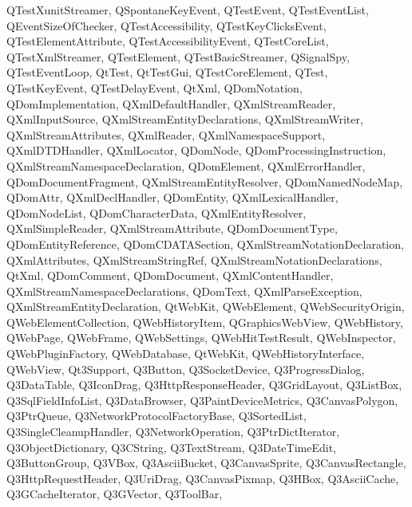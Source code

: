 {{    QTestXunitStreamer,%
    QSpontaneKeyEvent,%
    QTestEvent,%
    QTestEventList,%
    QEventSizeOfChecker,%
    QTestAccessibility,%
    QTestKeyClicksEvent,%
    QTestElementAttribute,%
    QTestAccessibilityEvent,%
    QTestCoreList,%
    QTestXmlStreamer,%
    QTestElement,%
    QTestBasicStreamer,%
    QSignalSpy,%
    QTestEventLoop,%
    QtTest,%
    QtTestGui,%
    QTestCoreElement,%
    QTest,%
    QTestKeyEvent,%
    QTestDelayEvent,%
    QtXml,%
    QDomNotation,%
    QDomImplementation,%
    QXmlDefaultHandler,%
    QXmlStreamReader,%
    QXmlInputSource,%
    QXmlStreamEntityDeclarations,%
    QXmlStreamWriter,%
    QXmlStreamAttributes,%
    QXmlReader,%
    QXmlNamespaceSupport,%
    QXmlDTDHandler,%
    QXmlLocator,%
    QDomNode,%
    QDomProcessingInstruction,%
    QXmlStreamNamespaceDeclaration,%
    QDomElement,%
    QXmlErrorHandler,%
    QDomDocumentFragment,%
    QXmlStreamEntityResolver,%
    QDomNamedNodeMap,%
    QDomAttr,%
    QXmlDeclHandler,%
    QDomEntity,%
    QXmlLexicalHandler,%
    QDomNodeList,%
    QDomCharacterData,%
    QXmlEntityResolver,%
    QXmlSimpleReader,%
    QXmlStreamAttribute,%
    QDomDocumentType,%
    QDomEntityReference,%
    QDomCDATASection,%
    QXmlStreamNotationDeclaration,%
    QXmlAttributes,%
    QXmlStreamStringRef,%
    QXmlStreamNotationDeclarations,%
    QtXml,%
    QDomComment,%
    QDomDocument,%
    QXmlContentHandler,%
    QXmlStreamNamespaceDeclarations,%
    QDomText,%
    QXmlParseException,%
    QXmlStreamEntityDeclaration,%
    QtWebKit,%
    QWebElement,%
    QWebSecurityOrigin,%
    QWebElementCollection,%
    QWebHistoryItem,%
    QGraphicsWebView,%
    QWebHistory,%
    QWebPage,%
    QWebFrame,%
    QWebSettings,%
    QWebHitTestResult,%
    QWebInspector,%
    QWebPluginFactory,%
    QWebDatabase,%
    QtWebKit,%
    QWebHistoryInterface,%
    QWebView,%
    Qt3Support,%
    Q3Button,%
    Q3SocketDevice,%
    Q3ProgressDialog,%
    Q3DataTable,%
    Q3IconDrag,%
    Q3HttpResponseHeader,%
    Q3GridLayout,%
    Q3ListBox,%
    Q3SqlFieldInfoList,%
    Q3DataBrowser,%
    Q3PaintDeviceMetrics,%
    Q3CanvasPolygon,%
    Q3PtrQueue,%
    Q3NetworkProtocolFactoryBase,%
    Q3SortedList,%
    Q3SingleCleanupHandler,%
    Q3NetworkOperation,%
    Q3PtrDictIterator,%
    Q3ObjectDictionary,%
    Q3CString,%
    Q3TextStream,%
    Q3DateTimeEdit,%
    Q3ButtonGroup,%
    Q3VBox,%
    Q3AsciiBucket,%
    Q3CanvasSprite,%
    Q3CanvasRectangle,%
    Q3HttpRequestHeader,%
    Q3UriDrag,%
    Q3CanvasPixmap,%
    Q3HBox,%
    Q3AsciiCache,%
    Q3GCacheIterator,%
    Q3GVector,%
    Q3ToolBar,%
}}
